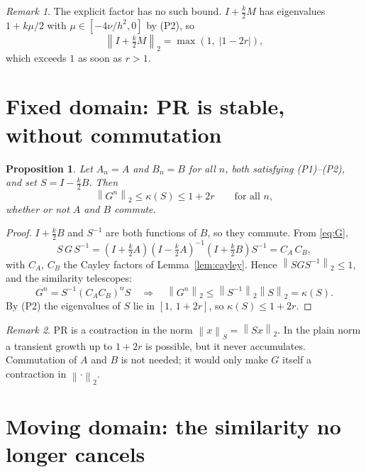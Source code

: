 \documentclass[11pt]{article}
\newtheorem{proposition}{Proposition}
\theoremstyle{remark}
\newtheorem*{remark}{Remark}
\newcommand{\norm}[1]{\left\lVert #1 \right\rVert}
\newcommand{\Id}{I}
\begin{document}
\begin{remark}
The explicit factor has no such bound. $\Id + \tfrac{k}{2}M$ has eigenvalues $1 + k\mu/2$ with $\mu \in [-4\nu/h^2, 0]$ by (P2), so
\begin{equation}
  \norm{\Id + \tfrac{k}{2}M}_2 = \max\!\left(1,\; \left|1 - 2r\right|\right),
\end{equation}
which exceeds $1$ as soon as $r > 1$.
\end{remark}

\section{Fixed domain: PR is stable, without commutation}

\begin{proposition}\label{prop:fixed}
Let $A_n = A$ and $B_n = B$ for all $n$, both satisfying (P1)--(P2), and set $S = \Id - \tfrac{k}{2}B$. Then
\begin{equation}
  \norm{G^n}_2 \le \kappa(S) \le 1 + 2r \qquad \text{for all } n,
\end{equation}
whether or not $A$ and $B$ commute.
\end{proposition}
\begin{proof}
$\Id + \tfrac{k}{2}B$ and $S^{-1}$ are both functions of $B$, so they commute. From \eqref{eq:G},
\begin{equation}
  S\,G\,S^{-1}
  = \left(\Id + \tfrac{k}{2}A\right)\left(\Id - \tfrac{k}{2}A\right)^{-1} \left(\Id + \tfrac{k}{2}B\right) S^{-1}
  = C_A\, C_B ,
\end{equation}
with $C_A$, $C_B$ the Cayley factors of Lemma~\ref{lem:cayley}. Hence $\norm{SGS^{-1}}_2 \le 1$, and the similarity telescopes:
\begin{equation}
  G^n = S^{-1} \left(C_A C_B\right)^n S
  \quad\Longrightarrow\quad
  \norm{G^n}_2 \le \norm{S^{-1}}_2 \norm{S}_2 = \kappa(S).
\end{equation}
By (P2) the eigenvalues of $S$ lie in $[1,\, 1 + 2r]$, so $\kappa(S) \le 1 + 2r$.
\end{proof}

\begin{remark}
PR is a contraction in the norm $\norm{x}_S = \norm{Sx}_2$. In the plain norm a transient growth up to $1 + 2r$ is possible, but it never accumulates. Commutation of $A$ and $B$ is not needed; it would only make $G$ itself a contraction in $\norm{\cdot}_2$.
\end{remark}

\section{Moving domain: the similarity no longer cancels}
\end{document}
